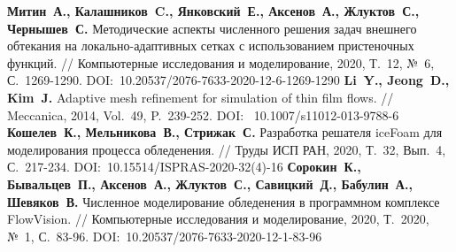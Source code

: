 \begin{thebibliography}{99}
%
\textbf{Митин~А., Калашников~C., Янковский~Е., Аксенов~А., Жлуктов~С., Чернышев~С.} Методические аспекты численного решения задач внешнего обтекания на локально-адаптивных сетках с использованием пристеночных функций. // Компьютерные исследования и моделирование, 2020, Т.~12, №~6, С.~1269-1290. DOI:~10.20537/2076-7633-2020-12-6-1269-1290
%
\textbf{Li~Y., Jeong~D., Kim~J.} Adaptive mesh refinement for simulation of thin film flows. // Meccanica, 2014, Vol.~49, P.~239-252. DOI:~ 10.1007/s11012-013-9788-6
%
\textbf{Кошелев~К., Мельникова~В., Стрижак~С.} Разработка решателя iceFoam для моделирования процесса обледенения. // Труды ИСП РАН, 2020, Т.~32, Вып.~4, С.~217-234. DOI:~10.15514/ISPRAS-2020-32(4)-16
%
\textbf{Сорокин~К., Бывальцев~П., Аксенов~А., Жлуктов~С., Савицкий~Д., Бабулин~А., Шевяков~В.} Численное моделирование обледенения в программном комплексе FlowVision. // Компьютерные исследования и моделирование, 2020, Т.~2020, №~1, С.~83-96. DOI:~10.20537/2076-7633-2020-12-1-83-96
%




\end{thebibliography}
